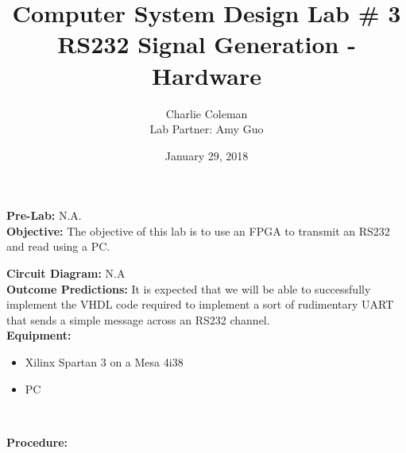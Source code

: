 \documentclass{article}
\title{Computer System Design Lab \# 3\\RS232 Signal Generation - Hardware}
\author{Charlie Coleman \\ Lab Partner: Amy Guo}
\date{January 29, 2018}
\newcommand{\sect}[1]{\noindent\textbf{#1}}
\begin{document}
\maketitle
\pagebreak

\sect{Pre-Lab:} N.A.\\

\sect{Objective:} The objective of this lab is to use an FPGA to transmit an RS232 and read using a PC.

\sect{Circuit Diagram:} N.A\\

\sect{Outcome Predictions:} It is expected that we will be able to successfully implement the VHDL code required to implement a sort of rudimentary UART that sends a simple message across an RS232 channel.\\

\sect{Equipment:}

\begin{itemize}[noitemsep, nolistsep]
	\item Xilinx Spartan 3 on a Mesa 4i38
	\item PC
\end{itemize}~

\sect{Procedure:}
\end{document}
